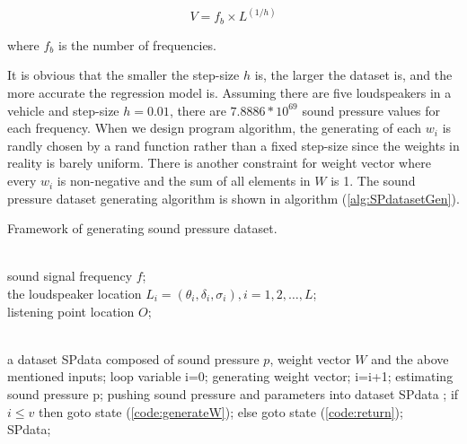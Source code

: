\documentclass[runningheads,a4paper]{llncs}
\begin{document}
\begin{equation}\label{eq:datasize}
    V=f_b \times L^(1/h)
\end{equation}\label{eq:datasize}

where $f_b$ is the number of frequencies.

It is obvious that the smaller the step-size $ h $ is, the larger the dataset is, and the  more accurate the regression model is. Assuming there are five loudspeakers in a vehicle and step-size $h=0.01$, there are $7.8886*10^69$ sound pressure values for each frequency. When we design program algorithm, the generating of each $w_i$ is randly chosen by a rand function rather than a fixed step-size since the weights in reality is barely uniform. There is another constraint for weight vector where every $w_i$ is non-negative and the sum of all elements in $W$ is 1. The sound pressure dataset generating algorithm is shown in algorithm (\ref{alg:SPdatasetGen}).

\begin{algorithm}[htb]
    \caption{ Framework of generating sound pressure dataset.}
    \label{alg:SPdatasetGen}
    \begin{algorithmic}[1]
      \Require   \\ %
        sound signal frequency $f$;  \\
        the loudspeaker location $L_i=(\theta_i,\delta_i,\sigma_i),i=1,2,\dots,L$;  \\
        listening point location $O$;

      \Ensure    \\ %
        a dataset SPdata composed of sound pressure $p$, weight vector $W$ and the above mentioned inputs;
      \State loop variable i=0;
      \label{code:generateW}
      \State generating weight vector;
      \State i=i+1;
      \State estimating sound pressure p;
      \label{code:estimateP}
      \State pushing sound pressure and parameters into dataset SPdata ;
      \label{code:pushdataset}
      \State if $i \leq v$ then goto state (\ref{code:generateW});  else goto state (\ref{code:return}); \\
      \Return SPdata;
      \label{code:return}
    \end{algorithmic}
  \end{algorithm}
\end{document}
